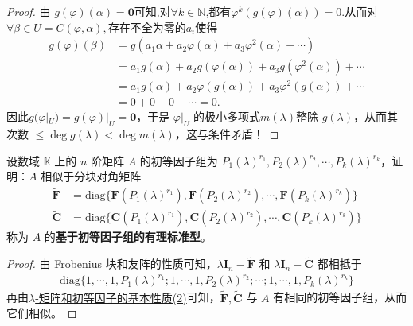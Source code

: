\documentclass[../../main.tex]{subfiles}
\begin{document}
\begin{proof}
由 $g(\varphi)(\alpha)=\mathbf{0}$可知,对$\forall k\in \mathbb{N}$,都有$\varphi^k(g(\varphi)(\alpha))=0$.从而对$\forall \beta \in U=C(\varphi,\alpha),$存在不全为零的$a_i$使得
\begin{align*}
g(\varphi)(\beta)&=g\left( a_1\alpha +a_2\varphi \left( \alpha \right) +a_3\varphi ^2\left( \alpha \right) +\cdots \right) 
\\
&=a_1g\left( \alpha \right) +a_2g\left( \varphi \left( \alpha \right) \right) +a_3g\left( \varphi ^2\left( \alpha \right) \right) +\cdots 
\\
&=a_1g\left( \alpha \right) +a_2\varphi \left( g\left( \alpha \right) \right) +a_3\varphi ^2\left( g\left( \alpha \right) \right) +\cdots \\
&=0+0+0+\cdots=0.
\end{align*}
因此$g(\varphi|_U)=g(\varphi)|_U = \mathbf{0}$，于是 $\varphi|_U$ 的极小多项式$m(\lambda)$整除 $g(\lambda)$，从而其次数 $\leq\deg g(\lambda)<\deg m(\lambda)$，这与条件矛盾！
\end{proof}

\begin{theorem}[基于初等因子组的有理标准型]\label{theorem:基于初等因子组的有理标准型}
设数域 $\mathbb{K}$ 上的 $n$ 阶矩阵 $A$ 的初等因子组为 $P_1(\lambda)^{r_1},P_2(\lambda)^{r_2},\cdots,P_k(\lambda)^{r_k}$，证明：$A$ 相似于分块对角矩阵
\begin{align*}
\widetilde{\boldsymbol{F}}&=\mathrm{diag}\{\boldsymbol{F}(P_1(\lambda)^{r_1}),\boldsymbol{F}(P_2(\lambda)^{r_2}),\cdots,\boldsymbol{F}(P_k(\lambda)^{r_k})\}\\
\widetilde{\boldsymbol{C}}&=\mathrm{diag}\{\boldsymbol{C}(P_1(\lambda)^{r_1}),\boldsymbol{C}(P_2(\lambda)^{r_2}),\cdots,\boldsymbol{C}(P_k(\lambda)^{r_k})\}
\end{align*}
称为 $A$ 的\textbf{基于初等因子组的有理标准型}。
\end{theorem}
\begin{proof}
由 Frobenius 块和友阵的性质可知，$\lambda\boldsymbol{I}_n - \widetilde{\boldsymbol{F}}$ 和 $\lambda\boldsymbol{I}_n - \widetilde{\boldsymbol{C}}$ 都相抵于
\begin{align*}
\mathrm{diag}\{1,\cdots,1,P_1(\lambda)^{r_1};1,\cdots,1,P_2(\lambda)^{r_2};\cdots;1,\cdots,1,P_k(\lambda)^{r_k}\}
\end{align*}
再由\hyperref[theorem:lambda-矩阵和初等因子的基本性质]{$\lambda$-矩阵和初等因子的基本性质(2)}可知，$\widetilde{\boldsymbol{F}},\widetilde{\boldsymbol{C}}$ 与 $A$ 有相同的初等因子组，从而它们相似。
\end{proof}
\end{document}
